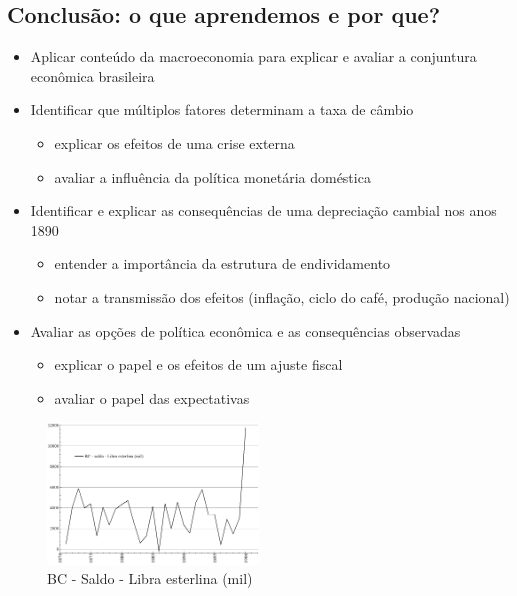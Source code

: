 \documentclass[a4paper,12pt]{article}[abntex2]
\begin{document}
\subsection{\textbf{Conclusão: o que aprendemos e por que?}}
\begin{itemize}
    \item Aplicar conteúdo da macroeconomia para explicar e avaliar a conjuntura econômica brasileira
    \item  Identificar que múltiplos fatores determinam a taxa de câmbio
    \begin{itemize}
        \item  explicar os efeitos de uma crise externa
    \end{itemize}
    \begin{itemize}
        \item  avaliar a influência da política monetária doméstica
    \end{itemize}
\item Identificar e explicar as consequências de uma depreciação cambial nos anos 1890
\begin{itemize}
    \item entender a importância da estrutura de endividamento
\end{itemize}
\begin{itemize}
    \item notar a transmissão dos efeitos (inflação, ciclo do café, produção nacional)
\end{itemize}
\item Avaliar as opções de política econômica e as consequências observadas
\begin{itemize}
    \item explicar o papel e os efeitos de um ajuste fiscal
\end{itemize}
\begin{itemize}
    \item  avaliar o papel das expectativas
\end{itemize}
\end{itemize}

\begin{figure}[H]
    \centering
    \includegraphics[width=0.5\textwidth]{Imagens Slides/i1a10.png}
    \caption{BC - Saldo - Libra esterlina (mil)}
\end{figure}
\end{document}

